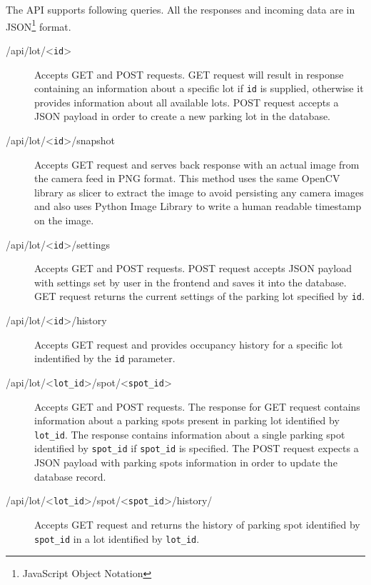 \documentclass[thesis=M,english]{FITthesis}[2019/03/06]
\begin{document}
The API supports following queries. All the responses and incoming data are in JSON\footnote{JavaScript Object Notation} format.
\begin{description}
    \item [/api/lot/<\texttt{id}>] {Accepts GET and POST requests. GET request will result in response containing an information about a specific lot if \texttt{id} is supplied, otherwise it provides information about all available lots. POST request accepts a JSON payload in order to create a new parking lot in the database.}
    
     \item [/api/lot/<\texttt{id}>/snapshot] {Accepts GET request and serves back response with an actual image from the camera feed in PNG format. This method uses the same OpenCV library as slicer to extract the image to avoid persisting any camera images and also uses Python Image Library to write a human readable timestamp on the image.}
     
     \item [/api/lot/<\texttt{id}>/settings] {Accepts GET and POST requests. POST request accepts JSON payload with settings set by user in the frontend and saves it into the database. GET request returns the current settings of the parking lot specified by \texttt{id}.}
     
    \item [/api/lot/<\texttt{id}>/history] {Accepts GET request and provides occupancy history for a specific lot indentified by the \texttt{id} parameter.}
    
    \item [/api/lot/<\texttt{lot\_id}>/spot/<\texttt{spot\_id}>] {Accepts GET and POST requests. The response for GET request contains information about a parking spots present in parking lot identified by \texttt{lot\_id}. The response contains information about a single parking spot identified by \texttt{spot\_id} if \texttt{spot\_id} is specified. The POST request expects a JSON payload with parking spots information in order to update the database record.}
    
    \item [/api/lot/<\texttt{lot_id}>/spot/<\texttt{spot_id}>/history/] {Accepts GET request and returns the history of parking spot identified by \texttt{spot_id} in a lot identified by \texttt{lot_id}.}

    
   
\end{description}
\end{document}
